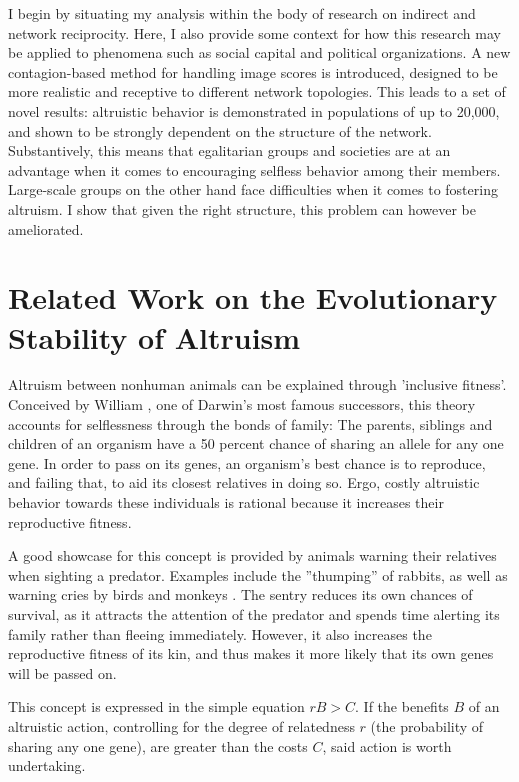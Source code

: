 \documentclass{JASSS}
\begin{document}
I begin by situating my analysis within the body of research on indirect and network reciprocity. Here, I also provide some context for how this research may be applied to phenomena such as social capital and political organizations. A new contagion-based method for handling image scores is introduced, designed to be more realistic and receptive to different network topologies. This leads to a set of novel results: altruistic behavior is demonstrated in populations of up to 20,000, and shown to be strongly dependent on the structure of the network. Substantively, this means that egalitarian groups and societies are at an advantage when it comes to encouraging selfless behavior among their members. Large-scale groups on the other hand face difficulties when it comes to fostering altruism. I show that given the right structure, this problem can however be ameliorated.

\section{Related Work on the Evolutionary Stability of Altruism}
Altruism between nonhuman animals can be explained through 'inclusive fitness'. Conceived by William \cite{Hamilton1964}, one of Darwin's most famous successors, this theory accounts for selflessness through the bonds of family: The parents, siblings and children of an organism have a 50 percent chance of sharing an allele for any one gene. In order to pass on its genes, an organism's best chance is to reproduce, and failing that, to aid its closest relatives in doing so. Ergo, costly altruistic behavior towards these individuals is rational because it increases their reproductive fitness.

A good showcase for this concept is provided by animals warning their relatives when sighting a predator. Examples include the ''thumping'' of rabbits, as well as warning cries by birds and monkeys \citep{Hamilton1964_2}. The sentry reduces its own chances of survival, as it attracts the attention of the predator and spends time alerting its family rather than fleeing immediately. However, it also increases the reproductive fitness of its kin, and thus makes it more likely that its own genes will be passed on.

This concept is expressed in the simple equation $rB > C$. If the benefits $B$ of an altruistic action, controlling for the degree of relatedness $r$ (the probability of sharing any one gene), are greater than the costs $C$, said action is worth undertaking.
\end{document}
